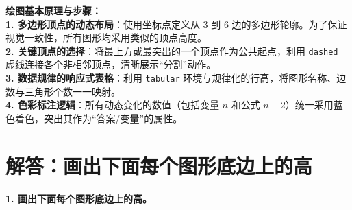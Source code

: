 \vspace{0.6cm}

{\small\color{blue!70!black}
\textbf{绘图基本原理与步骤：}\\
\textbf{1. 多边形顶点的动态布局}：使用坐标点定义从 $3$ 到 $6$ 边的多边形轮廓。为了保证视觉一致性，所有图形均采用类似的顶点高度。\\
\textbf{2. 关键顶点的选择}：将最上方或最突出的一个顶点作为公共起点，利用 \texttt{dashed} 虚线连接各个非相邻顶点，清晰展示“分割”动作。\\
\textbf{3. 数据规律的响应式表格}：利用 \texttt{tabular} 环境与规律化的行高，将图形名称、边数与三角形个数一一映射。\\
\textbf{4. 色彩标注逻辑}：所有动态变化的数值（包括变量 $n$ 和公式 $n-2$）统一采用蓝色着色，突出其作为“答案/变量”的属性。
}



\newpage



\newpage

\section{解答：画出下面每个图形底边上的高}

\vspace{0.4cm}

\noindent\textbf{1. 画出下面每个图形底边上的高。}

\vspace{1.2cm}

